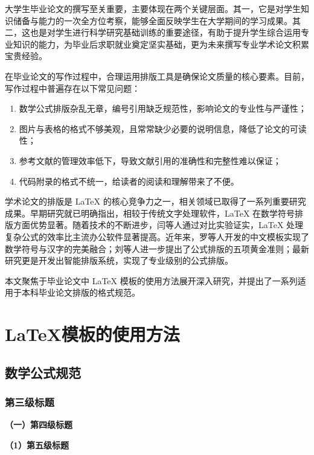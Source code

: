 \documentclass{jyuthesis}
\let\oldsection\section
\renewcommand\section{\clearpage\oldsection}  %
\begin{document}
大学生毕业论文的撰写至关重要，主要体现在两个关键层面。其一，它是对学生知识储备与能力的一次全方位考察，能够全面反映学生在大学期间的学习成果。其二，这也是对学生进行科学研究基础训练的重要途径，有助于提升学生综合运用专业知识的能力，为毕业后求职就业奠定坚实基础，更为未来撰写专业学术论文积累宝贵经验。

在毕业论文的写作过程中，合理运用排版工具是确保论文质量的核心要素。目前，写作过程中普遍存在以下常见问题：
\begin{enumerate}[label=(\arabic*)]
    \item 数学公式排版杂乱无章，编号引用缺乏规范性，影响论文的专业性与严谨性；
    \item 图片与表格的格式不够美观，且常常缺少必要的说明信息，降低了论文的可读性；
    \item 参考文献的管理效率低下，导致文献引用的准确性和完整性难以保证；
    \item 代码附录的格式不统一，给读者的阅读和理解带来了不便。
\end{enumerate}

学术论文的排版是 \LaTeX{} 的核心竞争力之一，相关领域已取得了一系列重要研究成果。早期研究就已明确指出，相较于传统文字处理软件，\LaTeX{} 在数学符号排版方面优势显著\cite{KJYU201010018}。随着技术的不断进步，闫等人\cite{BJXB201303037}通过对比实验证实，\LaTeX{} 处理复杂公式的效率比主流办公软件显著提高。近年来，罗等人\cite{JYKQ201611011}开发的中文模板实现了数学符号与汉字的完美融合；刘等人\cite{DNZS201933114}进一步提出了公式排版的五项黄金准则；最新研究\cite{JYRJ202212005}更是开发出智能排版系统，实现了专业级别的公式排版。

本文聚焦于毕业论文中 \LaTeX{} 模板的使用方法展开深入研究，并提出了一系列适用于本科毕业论文排版的格式规范。 

\section{\LaTeX{}模板的使用方法}

\subsection{数学公式规范}

\subsubsection{第三级标题}

\textbf{（一）第四级标题}

\textbf{（1）第五级标题}
\end{document}
